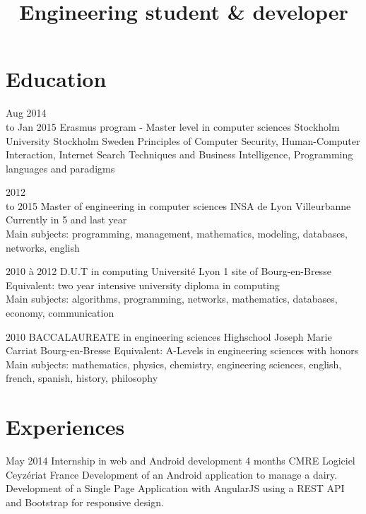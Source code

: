 \documentclass[10pt,a4paper]{moderncv}
\title{Engineering student \& developer}
\begin{document}
\maketitle
\pagestyle{empty}


\section{Education}

\cventry
	{Aug 2014\\to Jan 2015}
	{Erasmus program - Master level in computer sciences}
	{Stockholm University}
	{Stockholm}
	{Sweden}
	{Principles of Computer Security, Human-Computer Interaction, Internet Search Techniques and Business Intelligence, Programming languages and paradigms}

\cventry
	{2012\\to 2015}
	{Master of engineering in computer sciences}
	{INSA de Lyon}
	{Villeurbanne}
	{}
	{Currently in 5 and last year\\Main subjects: programming, management, mathematics, modeling, databases, networks, english}

\cventry
	{2010 à 2012}
	{D.U.T in computing}
	{Université Lyon 1}
	{site of Bourg-en-Bresse}
	{}
	{Equivalent: two year intensive university diploma in computing\\Main subjects: algorithms, programming, networks, mathematics, databases, economy, communication}

\cventry
	{2010}
	{BACCALAUREATE in engineering sciences}
	{Highschool Joseph Marie Carriat}
	{Bourg-en-Bresse}
	{}
	{Equivalent: A-Levels in engineering sciences with honors\\Main subjects: mathematics, physics, chemistry, engineering sciences, english, french, spanish, history, philosophy}


\section{Experiences}

\cventry
	{May 2014}
	{Internship in web and Android development}
	{4 months}
	{CMRE Logiciel}
	{Ceyzériat France}
	{Development of an Android application to manage a dairy. Development of a Single Page Application with AngularJS using a REST API and Bootstrap for responsive design.}
\end{document}
